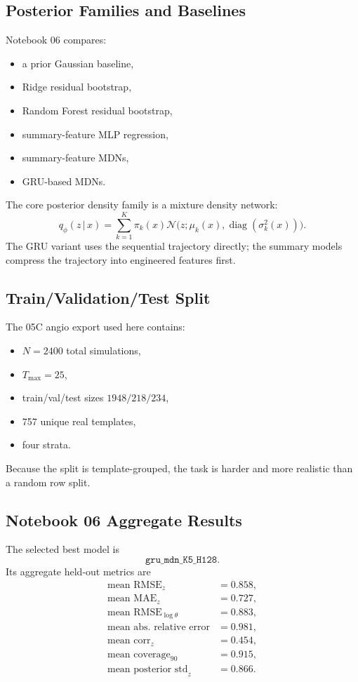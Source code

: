 \documentclass[11pt,a4paper]{article}
\newcommand{\diag}{\operatorname{diag}}
\newcommand{\Normal}{\mathcal{N}}
\newcommand{\given}{\,|\,}
\begin{document}
\subsection{Posterior Families and Baselines}

Notebook 06 compares:
\begin{itemize}[leftmargin=2em]
    \item a prior Gaussian baseline,
    \item Ridge residual bootstrap,
    \item Random Forest residual bootstrap,
    \item summary-feature MLP regression,
    \item summary-feature MDNs,
    \item GRU-based MDNs.
\end{itemize}

The core posterior density family is a mixture density network:
\[
    q_\phi(z\given x)
    =
    \sum_{k=1}^{K}\pi_k(x)\Normal\!\bigl(z;\mu_k(x),\diag(\sigma_k^2(x))\bigr).
\]
The GRU variant uses the sequential trajectory directly; the summary models compress the trajectory into engineered features first.

\subsection{Train/Validation/Test Split}

The 05C angio export used here contains:
\begin{itemize}[leftmargin=2em]
    \item $N=2400$ total simulations,
    \item $T_{\max}=25$,
    \item train/val/test sizes $1948/218/234$,
    \item 757 unique real templates,
    \item four strata.
\end{itemize}

Because the split is template-grouped, the task is harder and more realistic than a random row split.

\subsection{Notebook 06 Aggregate Results}

The selected best model is
\[
    \texttt{gru\_mdn\_K5\_H128}.
\]
Its aggregate held-out metrics are
\[
\begin{aligned}
    \text{mean RMSE}_z &= 0.858,\\
    \text{mean MAE}_z &= 0.727,\\
    \text{mean RMSE}_{\log\theta} &= 0.883,\\
    \text{mean abs.\ relative error} &= 0.981,\\
    \text{mean corr}_z &= 0.454,\\
    \text{mean coverage}_{90} &= 0.915,\\
    \text{mean posterior std}_z &= 0.866.
\end{aligned}
\]
\end{document}

